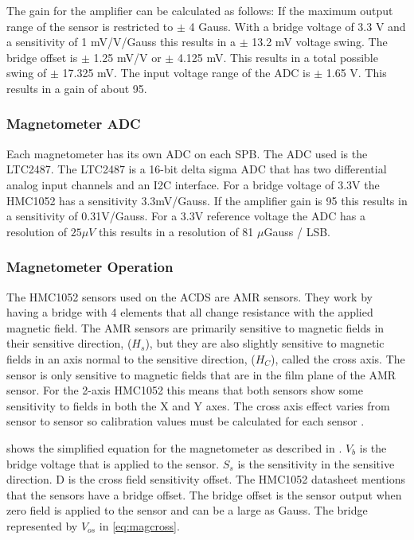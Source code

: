 The gain for the amplifier can be calculated as follows: If the maximum output range of the sensor is restricted to $\pm$ 4 Gauss. With a bridge voltage of 3.3 V and a sensitivity of 1 mV/V/Gauss this results in a $\pm$ 13.2 mV voltage swing. The bridge offset is $\pm$ 1.25 mV/V or $\pm$ 4.125 mV. This results in a total possible swing of $\pm$ 17.325 mV. The input voltage range of the \ac{ADC} is $\pm$ 1.65 V. This results in a gain of about 95. 

\subsubsection{Magnetometer \acl{ADC}}

Each magnetometer has its own \ac{ADC} on each \ac{SPB}. The \ac{ADC} used is the LTC2487. The LTC2487 is a 16-bit delta sigma \ac{ADC} that has two differential analog input channels and an \ac{I2C} interface. For a bridge voltage of 3.3V the HMC1052 has a sensitivity 3.3mV/Gauss. If the amplifier gain is 95 this results in a sensitivity of 0.31V/Gauss. For a 3.3V reference voltage the \ac{ADC} has a resolution of $25 \mu V$ this results in a resolution of 81 $\mu$Gauss / LSB.

\subsubsection{Magnetometer Operation}

The HMC1052 sensors used on the \ac{ACDS} are \ac{AMR} sensors. They work by having a bridge with 4 elements that all change resistance with the applied magnetic field. The \ac{AMR} sensors are primarily sensitive to magnetic fields in their sensitive direction, ($H_s$), but they are also slightly sensitive to magnetic fields in an axis normal to the sensitive direction, ($H_C$), called the cross axis. The sensor is only sensitive to magnetic fields that are in the film plane of the \ac{AMR} sensor. For the 2-axis HMC1052 this means that both sensors show some sensitivity to fields in both the X and Y axes. The cross axis effect varies from sensor to sensor  so calibration values must be calculated for each sensor \cite{AN215}.

 shows the simplified equation for the magnetometer as described in \cite{AN215}. $V_b$ is the bridge voltage that is applied to the sensor. $S_s$ is the sensitivity in the sensitive direction. D is the cross field sensitivity offset. The HMC1052 datasheet\cite{HMC1052} mentions that the sensors have a bridge offset. The bridge offset is the sensor output when zero field is applied to the sensor and can be a large as  Gauss. The bridge represented by $V_{os}$ in \cref{eq:magcross}.

